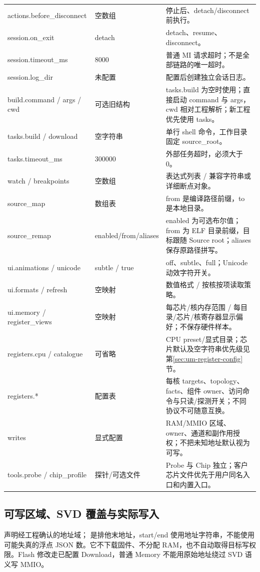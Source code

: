 \documentclass[UTF8,a4paper,11pt,oneside,fontset=none]{ctexart}
\newcommand{\code}[1]{\texttt{\detokenize{#1}}}
\begin{document}
\begin{longtable}{@{}P{42mm}P{32mm}P{87mm}@{}}
actions.before\_disconnect & 空数组 & 停止后、detach/disconnect 前执行。\\
session.on\_exit & detach & detach、resume、disconnect。\\
session.timeout\_ms & 8000 & 普通 MI 请求超时；不是全部链路的唯一超时。\\
session.log\_dir & 未配置 & 配置后创建独立会话日志。\\
build.command / args / cwd & 可选旧结构 & tasks.build 为空时使用；直接启动 command 与 args，cwd 相对工程解析；新工程优先使用 tasks。\\
tasks.build / download & 空字符串 & 单行 shell 命令，工作目录固定 source\_root。\\
tasks.timeout\_ms & 300000 & 外部任务超时，必须大于 0。\\
watch / breakpoints & 空数组 & 表达式列表 / 兼容字符串或详细断点对象。\\
source\_map & 数组表 & from 是编译路径前缀，to 是本地目录。\\
source\_remap & enabled/from/aliases & enabled 为可选布尔值；from 为 ELF 目录前缀，目标跟随 Source root；aliases 保存原路径拼写。\\
ui.animations / unicode & subtle / true & off、subtle、full；Unicode 动效字符开关。\\
ui.formats / refresh & 空映射 & 数值格式 / 按核按项读取策略。\\
ui.memory / register\_views & 空映射 & 每芯片/核内存范围 / 每目录/芯片/核寄存器显示偏好；不保存硬件样本。\\
registers.cpu / catalogue & 可省略 & CPU preset/显式目录；芯片默认及空字符串优先级见第\ref{sec:um-register-config}节。\\
registers.* & 配置表 & 每核 targets、topology、facts、组件 owner、访问命令与只读/探测开关；不同协议不可随意互换。\\
writes & 显式配置 & RAM/MMIO 区域、owner、通道和副作用授权；不把未知地址默认视为可写。\\
tools.probe / chip\_profile & 探针/可选文件 & Probe 与 Chip 独立；客户芯片文件优先于用户同名入口和内置入口。\\\bottomrule
\end{longtable}


\subsection{可写区域、SVD 覆盖与实际写入}
\label{sec:write-config-complete}
\code{[[writes.regions]]} 声明经工程确认的地址域；\code{end} 是排他末地址，start/end 使用地址字符串，不能使用可能失真的浮点 JSON 数。它不下载固件、不分配 RAM，也不自动取得目标写权限。Flash 修改走已配置 Download，普通 Memory 不能用原始地址绕过 SVD 语义写 MMIO。
\end{document}
